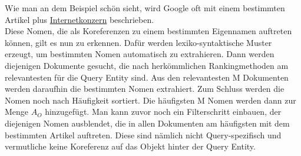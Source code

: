Wie man an dem Beispiel schön sieht, wird Google oft mit einem bestimmten Artikel plus \underline{Internetkonzern} beschrieben.\\
Diese Nomen, die als Koreferenzen zu einem bestimmten Eigennamen auftreten können, gilt es nun zu erkennen. Dafür werden lexiko-syntaktische Muster erzeugt, um bestimmten Nomen automatisch zu extrahieren. Dann werden diejenigen Dokumente gesucht, die nach herkömmlichen Rankingmethoden am relevantesten für die Query Entity sind. Aus den relevantesten M Dokumenten werden daraufhin die bestimmten Nomen extrahiert. Zum Schluss werden die Nomen noch nach Häufigkeit sortiert. Die häufigsten M Nomen werden dann zur Menge $A_O$ hinzugefügt. Man kann zuvor noch ein Filterschritt einbauen, der diejenigen Nomen ausblendet, die in allen Dokumenten am häufigsten mit dem bestimmten Artikel auftreten. Diese sind nämlich nicht Query-spezifisch und vermutliche keine Koreferenz auf das Objekt hinter der Query Entity. 
